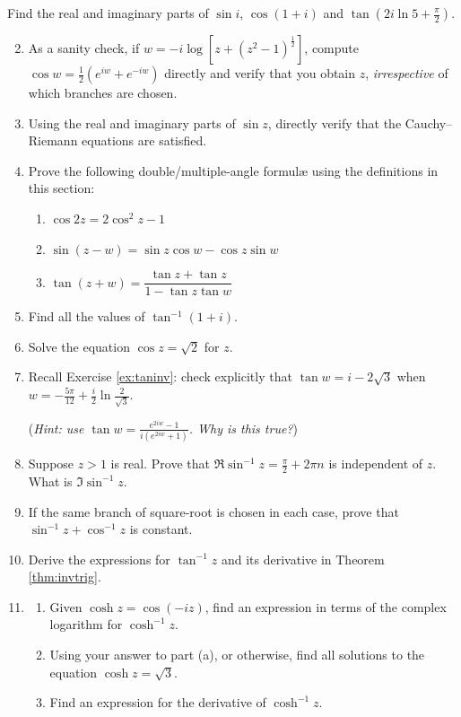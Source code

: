 \begin{exercises}
	\exstart Find the real and imaginary parts of $\sin i$, $\cos(1+i)$ and $\tan(2i\ln 5+\frac\pi 2)$.
	
	\begin{enumerate}\setcounter{enumi}{1}
	  \item As a sanity check, if $w =-i\log\left[z+(z^2-1)^{\frac 12}\right]$, compute $\cos w=\frac 12(e^{iw}+e^{-iw})$ directly and verify that you obtain $z$, \emph{irrespective} of which branches are chosen.
	  
	  
	  \item Using the real and imaginary parts of $\sin z$, directly verify that the Cauchy--Riemann equations are satisfied.
	  
	  
	  \item Prove the following double/multiple-angle formulæ using the definitions in this section:
	  \begin{enumerate}
	    \item $\cos 2z=2\cos^2z-1$
	    \item $\sin(z-w)=\sin z\cos w-\cos z\sin w$
	    \item $\tan(z+w)=\dfrac{\tan z +\tan z}{1-\tan z\tan w}$
	  \end{enumerate}
	  
	  
	  \item Find all the values of $\tan^{-1}(1+i)$.
	  
	  
	  \item Solve the equation $\cos z=\sqrt 2$ for $z$.
	  
	  
	  \item\label{ex:tanhint} Recall Exercise \ref{ex:taninv}: check explicitly that $\tan w=i-2\sqrt 3$ when $w=-\frac{5\pi}{12}+\frac i2\ln\frac 2{\sqrt 3}$.\par
	  (\emph{Hint: use $\tan w=\frac{e^{2iw}-1}{i(e^{2iw}+1)}$. Why is this true?})
	  
	  
	  \item Suppose $z>1$ is real. Prove that $\Re\sin^{-1}z=\frac\pi 2+2\pi n$ is independent of $z$. What is $\Im\sin^{-1}z$.
	  
	  
	  \item If the same branch of square-root is chosen in each case, prove that $\sin^{-1}z+\cos^{-1}z$ is constant.
	  
	  
	  \item Derive the expressions for $\tan^{-1}z$ and its derivative in Theorem \ref{thm:invtrig}.
	  
	  
	  \item\begin{enumerate}
	    \item Given $\cosh z=\cos(-iz)$, find an expression in terms of the complex logarithm for $\cosh^{-1}z$.
	    \item Using your answer to part (a), or otherwise, find all solutions to the equation $\cosh z=\sqrt 3$.
	    \item Find an expression for the derivative of $\cosh^{-1}z$.
	  \end{enumerate} 
	\end{enumerate}
\end{exercises}